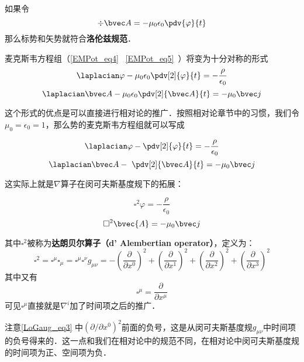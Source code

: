 
\begin{issues}
\issueDraft
\end{issues}


如果令
\begin{equation}
\div \bvec A = -\mu_0 \epsilon_0 \pdv{\varphi}{t}
\end{equation}
那么标势和矢势就符合\textbf{洛伦兹规范}． 

麦克斯韦方程组（\autoref{EMPot_eq4}~ \autoref{EMPot_eq5}~）将变为十分对称的形式
\begin{equation}\label{LoGaug_eq1}
\laplacian \varphi - \mu_0\epsilon_0 \pdv[2]{\varphi}{t} = -\frac{\rho}{\epsilon_0}
\end{equation}
\begin{equation}\label{LoGaug_eq2}
\laplacian \bvec A - \mu_0\epsilon_0 \pdv[2]{\bvec A}{t} = -\mu_0 \bvec j
\end{equation}

这个形式的优点是可以直接进行相对论的推广．按照相对论章节中的习惯，我们令$\mu_0=\epsilon_0=1$，那么势的麦克斯韦方程组就可以写成

\begin{equation}
\laplacian \varphi -  \pdv[2]{\varphi}{t} = -\frac{\rho}{\epsilon_0}
\end{equation}
\begin{equation}
\laplacian \bvec A - \ \pdv[2]{\bvec A}{t} = -\mu_0 \bvec j
\end{equation}

这实际上就是$\nabla$算子在闵可夫斯基度规下的拓展：

\begin{equation}
\square^2 \varphi = -\frac{\rho}{\epsilon_0}
\end{equation}
\begin{equation}
\square^2 \bvec{A} = -\mu_0 \bvec j
\end{equation}

其中$\square^2$被称为\textbf{达朗贝尔算子（d' Alembertian operator）}，定义为：
\begin{equation}\label{LoGaug_eq3}
\square^2=\square^\mu\square_\mu=\square^\mu\square^\nu g_{\mu\nu}=-(\frac{\partial}{\partial x^0})^2+(\frac{\partial}{\partial x^1})^2+(\frac{\partial}{\partial x^2})^2+(\frac{\partial}{\partial x^3})^2
\end{equation}
其中又有
\begin{equation}
\square^\mu=\frac{\partial}{\partial x^\mu}
\end{equation}
可见$\square^\mu$直接就是$\nabla^i$加了时间项之后的推广．

注意\autoref{LoGaug_eq3} 中$(\partial/\partial x^0)^2$前面的负号，这是从闵可夫斯基度规$g_{\mu\nu}$中时间项的负号得来的．这一点和我们在相对论中的规范不同，在相对论中闵可夫斯基度规的时间项为正、空间项为负．





